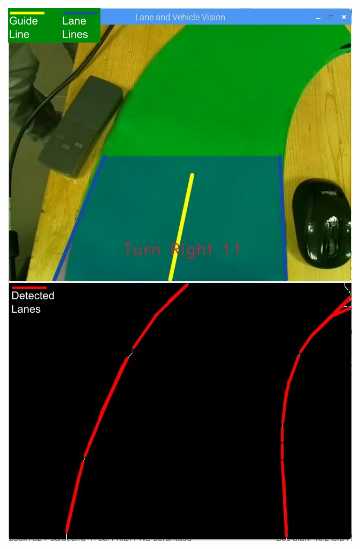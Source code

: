 \documentclass[a4paper,12pt]{article}
\begin{document}
	\begin{figure}[H]
		\setlength{\unitlength}{\textwidth} 
		\centering
		\begin{subfigure}{.5\textwidth}
	  		\centering
	  		\includegraphics[width=0.48\unitlength]{images/detection1-legend}
	  		\caption{\label{fig:} }
		\end{subfigure}%
		\begin{subfigure}{.5\textwidth}
	  		\centering

\end{subfigure}
\end{figure}
\end{document}
